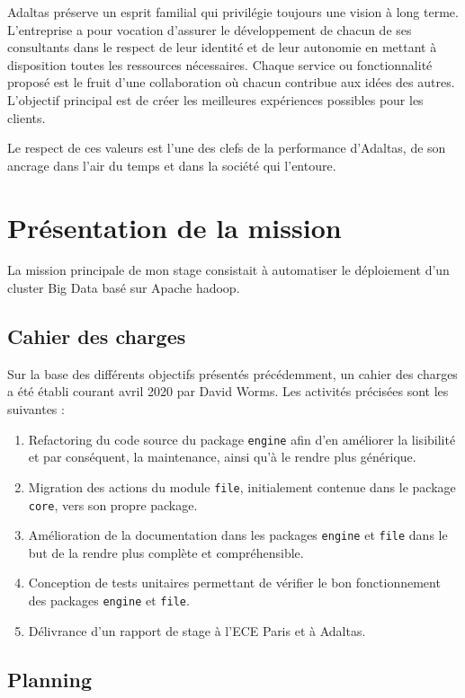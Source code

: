 \documentclass[12pt, french]{report}
\begin{document}
Adaltas préserve un esprit familial qui privilégie toujours une vision à long terme. L'entreprise a pour vocation d’assurer le développement de chacun de ses consultants dans le respect de leur identité et de leur autonomie en mettant à disposition toutes les ressources nécessaires. Chaque service ou fonctionnalité proposé est le fruit d’une collaboration où chacun contribue aux idées des autres. L'objectif principal est de créer les meilleures expériences possibles pour les clients.

Le respect de ces valeurs est l’une des clefs de la performance d'Adaltas, de son ancrage dans l’air du temps et dans la société qui l'entoure.

\chapter{Présentation de la mission}

La mission principale de mon stage consistait à automatiser le déploiement d'un cluster Big Data basé sur Apache \gls{hadoop}.

\section{Cahier des charges}

Sur la base des différents objectifs présentés précédemment, un cahier des charges a été établi courant avril 2020 par David Worms. Les activités précisées sont les suivantes : 

\begin{enumerate}
  \item Refactoring du code source du package \texttt{engine} afin d'en améliorer la lisibilité et par conséquent, la maintenance, ainsi qu'à le rendre plus générique.
  \item Migration des actions du module \texttt{file}, initialement contenue dans le package \texttt{core}, vers son propre package.
  \item Amélioration de la documentation dans les packages \texttt{engine} et \texttt{file} dans le but de la rendre plus complète et compréhensible.
  \item Conception de tests unitaires permettant de vérifier le bon fonctionnement des packages \texttt{engine} et \texttt{file}.
  \item Délivrance d'un rapport de stage à l'ECE Paris et à Adaltas.
\end{enumerate}

\section{Planning}
\end{document}

